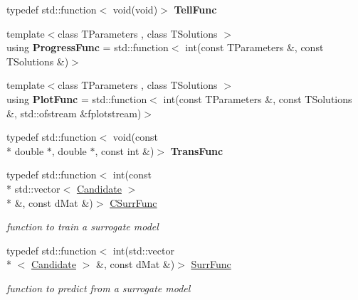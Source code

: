 \begin{DoxyCompactItemize}
\item 
\hypertarget{namespacelibcmaes_acee23101cbc8d94c127b10f3c04a595e}{typedef std\-::function$<$ void(void)$>$ {\bfseries Tell\-Func}}\label{namespacelibcmaes_acee23101cbc8d94c127b10f3c04a595e}

\item 
\hypertarget{namespacelibcmaes_a8d4db4c2a1758fd5964499aba7cf8a9f}{{\footnotesize template$<$class T\-Parameters , class T\-Solutions $>$ }\\using {\bfseries Progress\-Func} = std\-::function$<$ int(const T\-Parameters \&, const T\-Solutions \&)$>$}\label{namespacelibcmaes_a8d4db4c2a1758fd5964499aba7cf8a9f}

\item 
\hypertarget{namespacelibcmaes_aaf23de7982c40bf628eba76801677b78}{{\footnotesize template$<$class T\-Parameters , class T\-Solutions $>$ }\\using {\bfseries Plot\-Func} = std\-::function$<$ int(const T\-Parameters \&, const T\-Solutions \&, std\-::ofstream \&fplotstream)$>$}\label{namespacelibcmaes_aaf23de7982c40bf628eba76801677b78}

\item 
\hypertarget{namespacelibcmaes_a05b1e5e516cec9483ccdb964284ef82c}{typedef std\-::function$<$ void(const \\*
double $\ast$, double $\ast$, const int \&)$>$ {\bfseries Trans\-Func}}\label{namespacelibcmaes_a05b1e5e516cec9483ccdb964284ef82c}

\item 
typedef std\-::function$<$ int(const \\*
std\-::vector$<$ \hyperlink{classlibcmaes_1_1Candidate}{Candidate} $>$\\*
 \&, const d\-Mat \&)$>$ \hyperlink{namespacelibcmaes_ac7e88b4dfdaf94d6fa1e831ed5d9437e}{C\-Surr\-Func}
\begin{DoxyCompactList}\small\item\em function to train a surrogate model \end{DoxyCompactList}\item 
typedef std\-::function$<$ int(std\-::vector\\*
$<$ \hyperlink{classlibcmaes_1_1Candidate}{Candidate} $>$ \&, const d\-Mat \&)$>$ \hyperlink{namespacelibcmaes_a7115c4ca01f7e080f5c39c076242bf00}{Surr\-Func}
\begin{DoxyCompactList}\small\item\em function to predict from a surrogate model \end{DoxyCompactList}\end{DoxyCompactItemize}

